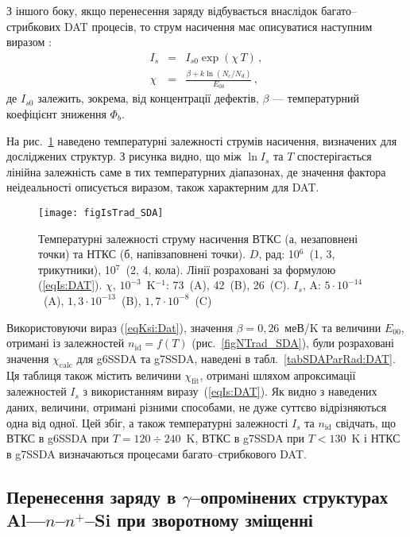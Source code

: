 З іншого боку,  якщо перенесення заряду відбувається внаслідок багато--стрибкових DAT процесів, то струм насичення має описуватися наступним виразом \cite{Evstropov}:
\begin{eqnarray}
  I_s&=&I_{s0}\exp(\chi\,T) \label{eqIs:DAT}\,,\\
   \chi&=&\frac{\beta+k\ln(N_c/N_d)}{E_{00}}\,, \label{eqKsi:Dat}
\end{eqnarray}
де
$I_{s0}$ залежить, зокрема, від концентрації дефектів,
$\beta$ --- температурний коефіцієнт зниження $\Phi_b$.

На рис.~\ref{figIsTrad_SDA} наведено температурні залежності струмів насичення, визначених для досліджених структур.
З рисунка видно, що між $\ln I_s$ та $T$ спостерігається лінійна залежність саме в тих температурних діапазонах,
де значення фактора неідеальності описується виразом, також характерним для DAT.


\begin{figure}
\center
\texttt{[image: figIsTrad\_SDA]}
\caption{\label{figIsTrad_SDA}
Температурні залежності струму насичення ВТКС (а, незаповнені точки)
та НТКС (б, напівзаповнені точки).
$D$, рад: 10$^6$~(1, 3, трикутники), 10$^7$~(2, 4, кола).
Лінії розраховані за формулою (\ref{eqIs:DAT}).
$\chi$, $10^{-3}$~K$^{-1}$: 73~(A), 42~(B), 26~(C).
$I_s$, A: $5\cdot10^{-14}$~(A),
$1,3\cdot10^{-13}$~(B),
$1,7\cdot10^{-8}$~(C)
}%
\end{figure}

Використовуючи вираз (\ref{eqKsi:Dat}), значення $\beta=0,26$~меВ/K \cite{Aboelfotoh, Evstropov} та величини $E_{00}$,
отримані із залежностей $n_\mathrm{id}=f(T)$ (рис.~\ref{figNTrad_SDA}),
були розраховані значення $\chi_\mathrm{calc}$ для g6SSDA та g7SSDA, наведені в табл.~\ref{tabSDAParRad:DAT}.
Ця таблиця також містить величини $\chi_\mathrm{fit}$, отримані шляхом апроксимації залежностей $I_s$ з використанням виразу~(\ref{eqIs:DAT}).
Як видно з наведених даних, величини, отримані різними способами, не дуже суттєво відрізняються одна від одної.
Цей збіг, а також температурні залежності $I_s$ та $n_\mathrm{id}$ свідчать,
що ВТКС в g6SSDA при $T=120\div240$~K, ВТКС в g7SSDA при $T<130$~K і НТКС в g7SSDA визначаються процесами багато--стрибкового DAT.






\subsection{Перенесення заряду в $\gamma$--опромінених структурах Al---$n$--$n^+$--Si при зворотному зміщенні}

